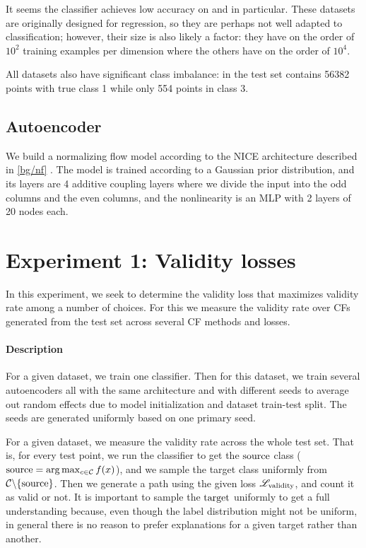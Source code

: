 \documentclass[../main.tex]{subfiles}
\begin{document}
It seems the classifier achieves low accuracy on \WineQuality{} and \OnlineNewsPopularity{} in particular.
These datasets are originally designed for regression, so they are perhaps not well adapted to classification; however, their size is also likely a factor: they have on the order of $10^2$ training examples per dimension where the others have on the order of $10^4$.

All datasets also have significant class imbalance: in \ForestCover{} the test set contains 56382 points with true class 1 while only 554 points in class 3.

\subsection{Autoencoder}

We build a normalizing flow model according to the NICE architecture described in \autoref{bg/nf} \cite{dinhNICE2015}.
The model is trained according to a Gaussian prior distribution, and its layers are 4 additive coupling layers where we divide the input into the odd columns and the even columns, and the nonlinearity is an MLP with 2 layers of 20 nodes each.

\section{Experiment 1: Validity losses}

In this experiment, we seek to determine the validity loss that maximizes validity rate among a number of choices.
For this we measure the validity rate over CFs generated from the test set across several CF methods and losses.

\paragraph{Description}
\label{validity_losses/description}

For a given dataset, we train one classifier.
Then for this dataset, we train several autoencoders all with the same architecture and with different seeds to average out random effects due to model initialization and dataset train-test split.
The seeds are generated uniformly based on one primary seed.

For a given dataset, we measure the validity rate across the whole test set.
That is, for every test point, we run the classifier to get the $\mathrm{source}$ class ($\mathrm{source} = \arg\max_{c \in \mathcal{C}} f(x)$), and we sample the target class uniformly from $\mathcal{C} \backslash \{\mathrm{source}\}$.
Then we generate a path using the given loss $\mathscr{L}_\text{validity}$, and count it as valid or not.
It is important to sample the $\mathrm{target}$ uniformly to get a full understanding because, even though the label distribution might not be uniform, in general there is no reason to prefer explanations for a given target rather than another.
\end{document}
